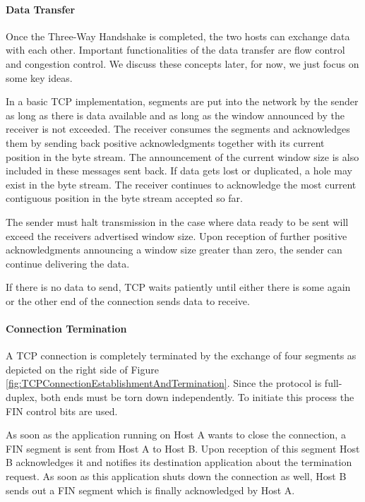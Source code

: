 \paragraph{Data Transfer}

Once the Three-Way Handshake is completed, the two hosts can exchange data with each other. Important functionalities of the data transfer are flow control and congestion control. We discuss these concepts later, for now, we just focus on some key ideas. 

In a basic TCP implementation, segments are put into the network by the sender as long as there is data available and as long as the window announced by the receiver is not exceeded. The receiver consumes the segments and acknowledges them by sending back positive acknowledgments together with its current position in the byte stream. The announcement of the current window size is also included in these messages sent back. If data gets lost or duplicated, a hole may exist in the byte stream. The receiver continues to acknowledge the most current contiguous position in the byte stream accepted so far.

The sender must halt transmission in the case where data ready to be sent will exceed the receivers advertised window size. Upon reception of further positive acknowledgments announcing a window size greater than zero, the sender can continue delivering the data.

If there is no data to send, TCP waits patiently until either there is some again or the other end of the connection sends data to receive.  

\paragraph{Connection Termination}

A TCP connection is completely terminated by the exchange of four segments as depicted on the right side of Figure \ref{fig:TCPConnectionEstablishmentAndTermination}. Since the protocol is full-duplex, both ends must be torn down independently. To initiate this process the FIN control bits are used. 

As soon as the application running on Host A wants to close the connection, a FIN segment is sent from Host A to Host B. Upon reception of this segment Host B acknowledges it and notifies its destination application about the termination request. As soon as this application shuts down the connection as well, Host B sends out a FIN segment which is finally acknowledged by Host A.

